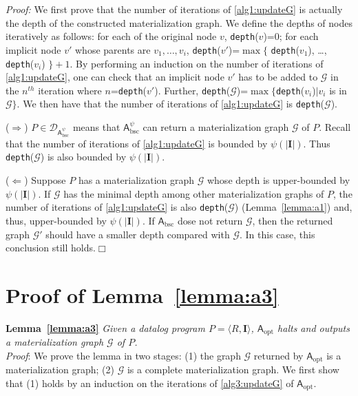 \noindent\emph{Proof:} We first prove that the number of iterations of \ref{alg1:updateG}
is actually the depth of the constructed materialization graph.
We define the depths of nodes iteratively as follows:
for each of the original node $v$, \texttt{depth}($v$)=0;
for each implicit node $v'$ whose parents are $v_1,\ldots ,v_i$, \texttt{depth}($v'$)=$\max$$\{$ \texttt{depth}($v_1$), \ldots , \texttt{depth}($v_i$) $\}+1$.
By performing an induction on the number of iterations of \ref{alg1:updateG},
one can check that an implicit node $v'$ has to be added to $\mathcal{G}$ in the $n^{th}$ iteration
where $n$=\texttt{depth}($v'$).
Further, \texttt{depth}($\mathcal{G}$)=$\max$$\{$\texttt{depth}($v_i$)$|v_i$ is in $\mathcal{G}\}$.
We then have that the number of iterations of \ref{alg1:updateG} is \texttt{depth}($\mathcal{G}$).

($\Rightarrow$) $P\in\mathcal{D}_{\mathsf{A}_{\text{bsc}}^{\psi}}$ means that $\mathsf{A}_{\text{bsc}}^{\psi}$ can return
a materialization graph $\mathcal{G}$ of $P$.
Recall that the number of iterations of \ref{alg1:updateG} is bounded by $\psi(|\textbf{I}|)$.
Thus \texttt{depth}($\mathcal{G}$) is also bounded by $\psi(|\textbf{I}|)$.

($\Leftarrow$) Suppose $P$ has a materialization graph $\mathcal{G}$ whose depth
is upper-bounded by $\psi(|\textbf{I}|)$.
If $\mathcal{G}$ has the minimal depth among other materialization graphs of $P$,
the number of iterations of \ref{alg1:updateG} is also \texttt{depth}($\mathcal{G}$) (Lemma~\ref{lemma:a1})
and, thus, upper-bounded by $\psi(|\textbf{I}|)$.
If $\mathsf{A}_{\text{bsc}}$ dose not return $\mathcal{G}$, then the returned graph $\mathcal{G}'$
should have a smaller depth compared with $\mathcal{G}$.
In this case, this conclusion still holds.\hfill$\Box$

\section{Proof of Lemma~\ref{lemma:a3}}

\textbf{Lemma~\ref{lemma:a3}}
\emph{Given a datalog program $P=\langle R, \textbf{I}\rangle$,
$\mathsf{A}_{\text{opt}}$ halts and outputs a materialization graph
$\mathcal{G}$ of $P$.}\\

\noindent\emph{Proof}: We prove the lemma in two stages:
(1) the graph $\mathcal{G}$ returned by $\mathsf{A}_{\text{opt}}$ is a materialization graph;
(2) $\mathcal{G}$ is a complete materialization graph.
We first show that (1) holds by an induction on the iterations of \ref{alg3:updateG} of $\mathsf{A}_{\text{opt}}$.


